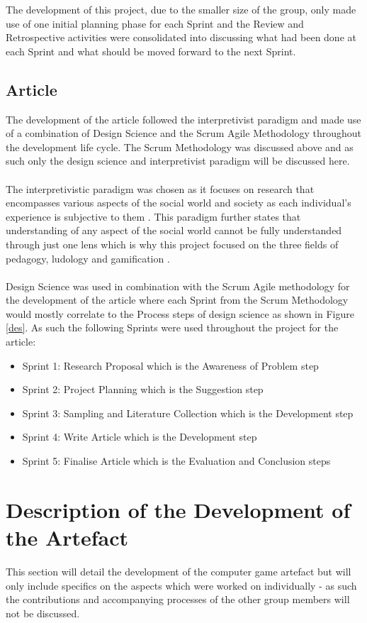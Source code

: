 \noindent The development of this project, due to the smaller size of the group, only made use of one initial planning phase for each Sprint and the Review and Retrospective activities were consolidated into discussing what had been done at each Sprint and what should be moved forward to the next Sprint.

\subsection{Article}
The development of the article followed the interpretivist paradigm and made use of a combination of Design Science and the Scrum Agile Methodology throughout the development life cycle. The Scrum Methodology was discussed above and as such only the design science and interpretivist paradigm will be discussed here. 
\\\\
The interpretivistic paradigm was chosen as it focuses on research that encompasses various aspects of the social world and society as each individual's  experience is subjective to them \citep{kivunja2017understanding}. This paradigm further states that understanding of any aspect of the social world cannot be fully understanded through just one lens which is why this project focused on the three fields of pedagogy, ludology and gamification \citep{kivunja2017understanding}.
\\\\
Design Science was used in combination with the Scrum Agile methodology for the development of the article where each Sprint from the Scrum Methodology would mostly correlate to the Process steps of design science as shown in Figure \ref{des}. As such the following Sprints were used throughout the project for the article:
\begin{itemize}
\item Sprint 1: Research Proposal which is the Awareness of Problem step
\item Sprint 2: Project Planning which is the Suggestion step
\item Sprint 3: Sampling and Literature Collection which is the Development step
\item Sprint 4: Write Article which is the Development step
\item Sprint 5: Finalise Article which is the Evaluation and Conclusion steps
\end{itemize}

\newpage 

\section{Description of the Development of the Artefact}
This section will detail the development of the computer game artefact but will only include specifics on the aspects which were worked on individually - as such the contributions and accompanying processes of the other group members will not be discussed. 

